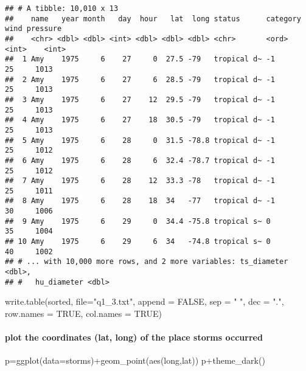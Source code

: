 \documentclass[
]{article}
\newenvironment{Shaded}{\begin{snugshade}}{\end{snugshade}}
\newcommand{\AttributeTok}[1]{\textcolor[rgb]{0.77,0.63,0.00}{#1}}
\newcommand{\ConstantTok}[1]{\textcolor[rgb]{0.00,0.00,0.00}{#1}}
\newcommand{\FunctionTok}[1]{\textcolor[rgb]{0.00,0.00,0.00}{#1}}
\newcommand{\NormalTok}[1]{#1}
\newcommand{\OtherTok}[1]{\textcolor[rgb]{0.56,0.35,0.01}{#1}}
\newcommand{\SpecialCharTok}[1]{\textcolor[rgb]{0.00,0.00,0.00}{#1}}
\newcommand{\StringTok}[1]{\textcolor[rgb]{0.31,0.60,0.02}{#1}}
\begin{document}
\begin{verbatim}
## # A tibble: 10,010 x 13
##    name   year month   day  hour   lat  long status      category  wind pressure
##    <chr> <dbl> <dbl> <int> <dbl> <dbl> <dbl> <chr>       <ord>    <int>    <int>
##  1 Amy    1975     6    27     0  27.5 -79   tropical d~ -1          25     1013
##  2 Amy    1975     6    27     6  28.5 -79   tropical d~ -1          25     1013
##  3 Amy    1975     6    27    12  29.5 -79   tropical d~ -1          25     1013
##  4 Amy    1975     6    27    18  30.5 -79   tropical d~ -1          25     1013
##  5 Amy    1975     6    28     0  31.5 -78.8 tropical d~ -1          25     1012
##  6 Amy    1975     6    28     6  32.4 -78.7 tropical d~ -1          25     1012
##  7 Amy    1975     6    28    12  33.3 -78   tropical d~ -1          25     1011
##  8 Amy    1975     6    28    18  34   -77   tropical d~ -1          30     1006
##  9 Amy    1975     6    29     0  34.4 -75.8 tropical s~ 0           35     1004
## 10 Amy    1975     6    29     6  34   -74.8 tropical s~ 0           40     1002
## # ... with 10,000 more rows, and 2 more variables: ts_diameter <dbl>,
## #   hu_diameter <dbl>
\end{verbatim}

\begin{Shaded}
\begin{Highlighting}[]
\FunctionTok{write.table}\NormalTok{(sorted, }\AttributeTok{file=}\StringTok{"q1\_3.txt"}\NormalTok{, }\AttributeTok{append =} \ConstantTok{FALSE}\NormalTok{, }\AttributeTok{sep =} \StringTok{" "}\NormalTok{, }\AttributeTok{dec =} \StringTok{"."}\NormalTok{,}
            \AttributeTok{row.names =} \ConstantTok{TRUE}\NormalTok{, }\AttributeTok{col.names =} \ConstantTok{TRUE}\NormalTok{)}
\end{Highlighting}
\end{Shaded}

\hypertarget{plot-the-coordinates-lat-long-of-the-place-storms-occurred}{%
\paragraph{plot the coordinates (lat, long) of the place storms
occurred}\label{plot-the-coordinates-lat-long-of-the-place-storms-occurred}}

\begin{Shaded}
\begin{Highlighting}[]
\NormalTok{p}\OtherTok{=}\FunctionTok{ggplot}\NormalTok{(}\AttributeTok{data=}\NormalTok{storms)}\SpecialCharTok{+}\FunctionTok{geom\_point}\NormalTok{(}\FunctionTok{aes}\NormalTok{(long,lat))}
\NormalTok{p}\SpecialCharTok{+}\FunctionTok{theme\_dark}\NormalTok{()}
\end{Highlighting}
\end{Shaded}
\end{document}
